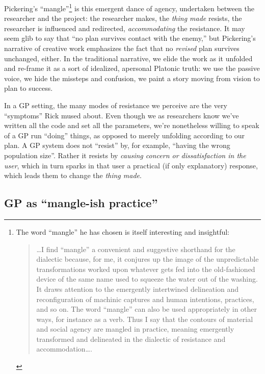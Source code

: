 Pickering's ``mangle''\footnote{The word ``mangle'' he has chosen is itself interesting and insightful:

\begin{quote}
\ldots{}I find ``mangle'' a convenient and suggestive shorthand for the dialectic because, for me, it conjures up the image of the unpredictable transformations worked upon whatever gets fed into the old-fashioned device of the same name used to squeeze the water out of the washing. It draws attention to the emergently intertwined delineation and reconfiguration of machinic captures and human intentions, practices, and so on. The word ``mangle'' can also be used appropriately in other ways, for instance as a verb. Thus I say that the contours of material and social agency are mangled in practice, meaning emergently transformed and delineated in the dialectic of resistance and accommodation\ldots{}.
\end{quote}} is this emergent dance of agency, undertaken between the researcher and the project: the researcher makes, the \emph{thing made} resists, the researcher is influenced and redirected, \emph{accommodating} the resistance. It may seem glib to say that ``no plan survives contact with the enemy,'' but Pickering's narrative of creative work emphasizes the fact that no \emph{revised} plan survives unchanged, either. In the traditional narrative, we elide the work as it unfolded and re-frame it as a sort of idealized, apersonal Platonic truth: we use the passive voice, we hide the missteps and confusion, we paint a story moving from vision to plan to success.

In a GP setting, the many modes of resistance we perceive are the very ``symptoms'' Rick mused about. Even though we as researchers know we've written all the code and set all the parameters, we're nonetheless willing to speak of a GP run ``doing'' things, as opposed to merely unfolding according to our plan. A GP system does not ``resist'' by, for example, ``having the wrong population size''. Rather it resists by \emph{causing concern or dissatisfaction in the user}, which in turn sparks in that user a practical (if only explanatory) response, which leads them to change the \emph{thing made}.

\subsection{GP as ``mangle-ish practice''}\hypertarget{gp-as-mangle-ish-practice}{}\label{gp-as-mangle-ish-practice}

